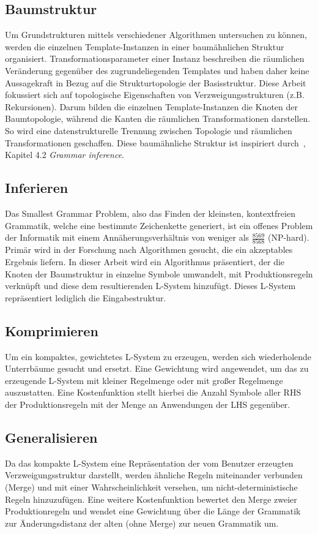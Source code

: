 \subsection*{Baumstruktur}
Um Grundstrukturen mittels verschiedener Algorithmen untersuchen zu können, werden die einzelnen Template-Instanzen in
einer baumähnlichen Struktur organisiert.
Transformationsparameter einer Instanz beschreiben die räumlichen Veränderung gegenüber des zugrundeliegenden Templates
und haben daher keine Aussagekraft in Bezug auf die Strukturtopologie der Basisstruktur.
Diese Arbeit fokussiert sich auf topologische Eigenschaften von Verzweigungsstrukturen (z.B. Rekursionen).
Darum bilden die einzelnen Template-Instanzen die Knoten der Baumtopologie, während die Kanten die räumlichen Transformationen
darstellen.
So wird eine datenstrukturelle Trennung zwischen Topologie und räumlichen Transformationen geschaffen.
Diese baumähnliche Struktur ist inspiriert durch~\cite{guo_2020}, Kapitel 4.2 \textit{Grammar inference}.

\subsection*{Inferieren}
Das Smallest Grammar Problem, also das Finden der kleinsten, kontextfreien Grammatik, welche eine bestimmte Zeichenkette
generiert, ist ein offenes Problem der Informatik mit einem Annäherungsverhältnis von weniger als $\frac{8569}{8568}$
(NP-hard)\cite{charikar_2005}.
Primär wird in der Forschung nach Algorithmen gesucht, die ein akzeptables Ergebnis liefern.
In dieser Arbeit wird ein Algorithmus präsentiert, der die Knoten der Baumstruktur in einzelne Symbole umwandelt, mit
Produktionsregeln verknüpft und diese dem resultierenden L-System hinzufügt.
Dieses L-System repräsentiert lediglich die Eingabestruktur.

\newpage

\subsection*{Komprimieren}
Um ein kompaktes, gewichtetes L-System zu erzeugen, werden sich wiederholende Unterrbäume gesucht und ersetzt.
Eine Gewichtung wird angewendet, um das zu erzeugende L-System mit kleiner Regelmenge oder mit
großer Regelmenge auszustatten.
Eine Kostenfunktion stellt hierbei die Anzahl Symbole aller RHS der Produktionsregeln mit der Menge an Anwendungen der
LHS gegenüber.

\subsection*{Generalisieren}
Da das kompakte L-System eine Repräsentation der vom Benutzer erzeugten Verzweigungsstruktur darstellt, werden ähnliche
Regeln miteinander verbunden (Merge) und mit einer Wahrscheinlichkeit versehen, um nicht-deterministische Regeln hinzuzufügen.
Eine weitere Kostenfunktion bewertet den Merge zweier Produktionregeln und wendet eine Gewichtung über die Länge der Grammatik
zur Änderungsdistanz der alten (ohne Merge) zur neuen Grammatik um.

